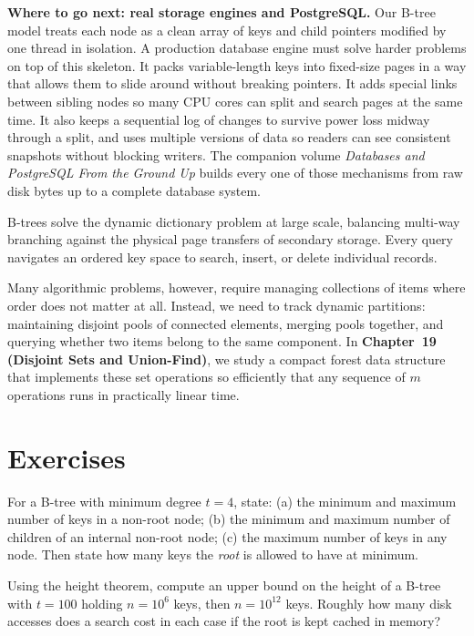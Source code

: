 \begin{connectionbox}
\textbf{Where to go next: real storage engines and PostgreSQL.}
Our B-tree model treats each node as a clean array of keys and child pointers modified by one
thread in isolation. A production database engine must solve harder problems on top of
this skeleton. It packs variable-length keys into fixed-size pages in a way that allows them to slide around without breaking pointers. It adds special links between sibling nodes so many CPU cores can split and search pages at the same time. It also keeps a sequential log of changes to survive power loss midway through a split, and uses multiple versions of data so readers can see consistent snapshots without blocking writers. The companion volume \emph{Databases and PostgreSQL
From the Ground Up} builds every one of those mechanisms from raw disk bytes up to a complete database system.
\end{connectionbox}

B-trees solve the dynamic dictionary problem at large scale, balancing multi-way branching
against the physical page transfers of secondary storage. Every query navigates an ordered key
space to search, insert, or delete individual records.

Many algorithmic problems, however, require managing collections of items where order
does not matter at all. Instead, we need to track dynamic partitions: maintaining disjoint pools of
connected elements, merging pools together, and querying whether two items belong to the same
component. In \textbf{Chapter~19 (Disjoint Sets and Union-Find)}, we study a compact
forest data structure that implements these set operations so efficiently that any sequence of $m$
operations runs in practically linear time.

\section*{Exercises}

\begin{exercise}\label{ch18:ex-warmup-bounds}
For a B-tree with minimum degree $t = 4$, state: (a) the minimum and maximum number
of keys in a non-root node; (b) the minimum and maximum number of children of an
internal non-root node; (c) the maximum number of keys in any node. Then state how
many keys the \emph{root} is allowed to have at minimum.
\end{exercise}

\begin{exercise}\label{ch18:ex-height-count}
Using the height theorem, compute an upper bound on the height of a B-tree with
$t = 100$ holding $n = 10^6$ keys, then $n = 10^{12}$ keys. Roughly how many disk
accesses does a search cost in each case if the root is kept cached in memory?
\end{exercise}

